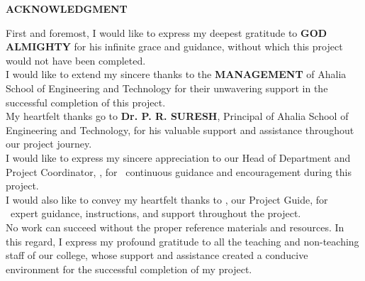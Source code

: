 \newpage
\thispagestyle{empty}

\begin{center}
	\fontsize{16}{18} 
	\textbf{ACKNOWLEDGMENT}\\
\end{center}

\vspace{0.2in}

\fontsize{12}{14}
\noindent First and foremost, I would like to express my deepest gratitude to \textbf{GOD ALMIGHTY} for his infinite grace and guidance, without which this project would not have been completed.\\
	
\noindent I would like to extend my sincere thanks to the \textbf{MANAGEMENT} of Ahalia School of Engineering and Technology for their unwavering support in the successful completion of this project.\\
	
\noindent My heartfelt thanks go to \textbf{Dr. P. R. SURESH}, Principal of Ahalia School of Engineering and Technology, for his valuable support and assistance throughout our project journey.\\
	
\noindent I would like to express my sincere appreciation to our Head of Department and Project Coordinator, \textbf{\hodCaps}, for \genderpronoun{\hodpronoun}\ continuous guidance and encouragement during this project.\\
	
\noindent I would also like to convey my heartfelt thanks to \textbf{\projguideCaps}, our Project Guide, for \genderpronoun{\projguidepronoun}\ expert guidance, instructions, and support throughout the project.\\
	
\noindent No work can succeed without the proper reference materials and resources. In this regard, I express my profound gratitude to all the teaching and non-teaching staff of our college, whose support and assistance created a conducive environment for the successful completion of my project.\\